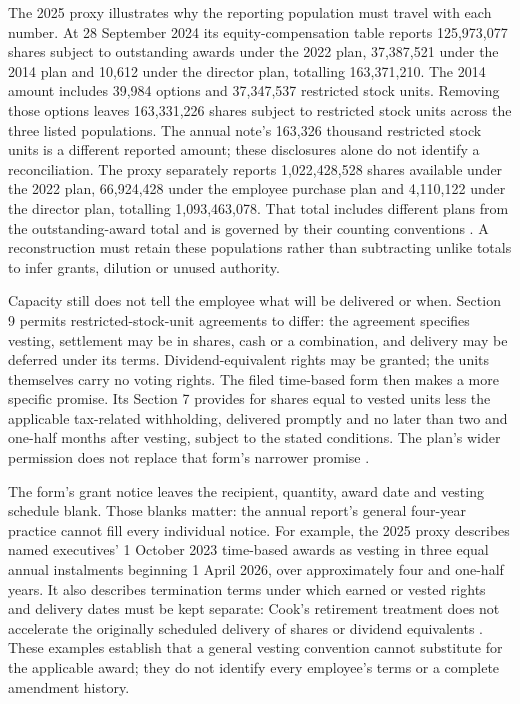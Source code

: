 The 2025 proxy illustrates why the reporting population must travel with each
number. At 28 September 2024 its equity-compensation table reports 125,973,077
shares subject to outstanding awards under the 2022 plan, 37,387,521 under the 2014 plan and
10,612 under the director plan, totalling 163,371,210. The 2014 amount includes
39,984 options and 37,347,537 restricted stock units. Removing those options
leaves 163,331,226 shares subject to restricted stock units across the three listed populations.
The annual note's 163,326 thousand restricted stock units is a different
reported amount; these disclosures alone do not identify a reconciliation.
The proxy separately reports 1,022,428,528 shares available under the 2022
plan, 66,924,428 under the employee purchase plan and 4,110,122 under the
director plan, totalling 1,093,463,078. That total includes different plans
from the outstanding-award total and is governed by their counting conventions
\citep[printed p.~97 and table footnotes]{apple2025proxy}. A reconstruction
must retain these populations rather than subtracting unlike totals to infer
grants, dilution or unused authority.

Capacity still does not tell the employee what will be delivered or when.
Section 9 permits restricted-stock-unit agreements to differ: the agreement
specifies vesting, settlement may be in shares, cash or a combination, and
delivery may be deferred under its terms. Dividend-equivalent rights may be
granted; the units themselves carry no voting rights. The filed time-based
form then makes a more specific promise. Its Section 7 provides for shares
equal to vested units less the applicable tax-related withholding, delivered
promptly and no later than two and one-half months after vesting, subject to
the stated conditions. The plan's wider permission does not replace that
form's narrower promise \citep[Exhibit 10.1, Section 9; Exhibit 10.2, Sections
7 and 11]{apple2022plan}.

The form's grant notice leaves the recipient, quantity, award date and vesting
schedule blank. Those blanks matter: the annual report's general four-year
practice cannot fill every individual notice. For example, the 2025 proxy
describes named executives' 1 October 2023 time-based awards as vesting in
three equal annual instalments beginning 1 April 2026, over approximately
four and one-half years. It also describes termination terms under which
earned or vested rights and delivery dates must be kept separate: Cook's
retirement treatment does not accelerate the originally scheduled delivery
of shares or dividend equivalents
\citep[Exhibit 10.2, grant notice and Section 8]{apple2022plan}
\citep[printed pp.~51 and 53--54]{apple2025proxy}. These examples establish
that a general vesting convention cannot substitute for the applicable award;
they do not identify every employee's terms or a complete amendment history.

